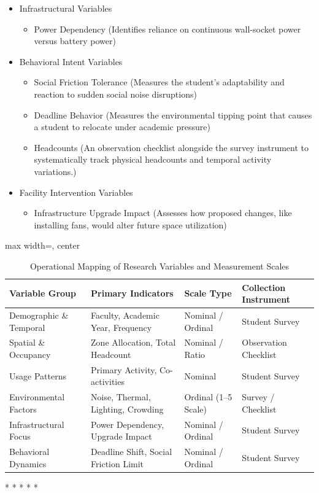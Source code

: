 \documentclass[12pt, a4paper]{report}
\begin{document}
\begin{itemize}
\begin{itemize}
    \end{itemize}
\item Infrastructural Variables
    \begin{itemize}
        \item Power Dependency (Identifies reliance on continuous wall-socket power versus battery power)
    \end{itemize}
\item Behavioral Intent Variables
    \begin{itemize}
        \item Social Friction Tolerance (Measures the student's adaptability and reaction to sudden social noise disruptions)
        \item Deadline Behavior (Measures the environmental tipping point that causes a student to relocate under academic pressure)
        \item Headcounts (An observation checklist alongside the survey instrument to systematically track physical headcounts and temporal activity variations.)
    \end{itemize}
\item Facility Intervention Variables
    \begin{itemize}
        \item Infrastructure Upgrade Impact (Assesses how proposed changes, like installing fans, would alter future space utilization)
    \end{itemize}
\end{itemize}


\begin{table}[h!]
\centering
\caption{Operational Mapping of Research Variables and Measurement Scales}
\label{tab:variable_mapping}
\begin{adjustbox}{max width=\linewidth, center} %
\footnotesize
\begin{tabular}{|l|l|l|l|}
\hline
\textbf{Variable Group} & \textbf{Primary Indicators} & \textbf{Scale Type} & \textbf{Collection Instrument} \\ \hline
Demographic \& Temporal & Faculty, Academic Year, Frequency & Nominal / Ordinal & Student Survey \\ \hline
Spatial \& Occupancy & Zone Allocation, Total Headcount & Nominal / Ratio & Observation Checklist \\ \hline
Usage Patterns & Primary Activity, Co-activities & Nominal & Student Survey \\ \hline
Environmental Factors & Noise, Thermal, Lighting, Crowding & Ordinal (1--5 Scale) & Survey / Checklist \\ \hline
Infrastructural Focus & Power Dependency, Upgrade Impact & Nominal / Ordinal & Student Survey \\ \hline
Behavioral Dynamics & Deadline Shift, Social Friction Limit & Nominal / Ordinal & Student Survey \\ \hline
\end{tabular}
\end{adjustbox}
\end{table}

\vspace{2.5cm}

\begin{center}
    * * * * *
\end{center}

\printindex
\end{document}
